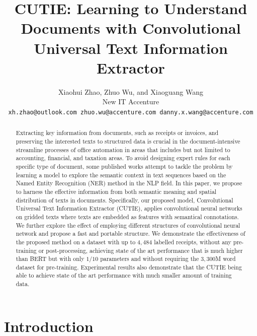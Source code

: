 \documentclass[10pt,twocolumn,letterpaper]{article}
\begin{document}
\title{CUTIE: Learning to Understand Documents with Convolutional Universal Text Information Extractor}

\author{
  Xiaohui Zhao, Zhuo Wu, and Xiaoguang Wang \\
  New IT Accenture \\
{\tt\small xh.zhao@outlook.com zhuo.wu@accenture.com danny.x.wang@accenture.com}
}

\maketitle

\begin{abstract}
   Extracting key information from documents, such as receipts or invoices, and preserving the interested texts to structured data is crucial in the document-intensive streamline processes of office automation in areas that includes but not limited to accounting, financial, and taxation areas. To avoid designing expert rules for each specific type of document, some published works attempt to tackle the problem by learning a model to explore the semantic context in text sequences based on the Named Entity Recognition (NER) method in the NLP field. In this paper, we propose to harness the effective information from both semantic meaning and spatial distribution of texts in documents. Specifically, our proposed model, Convolutional Universal Text Information Extractor (CUTIE), applies convolutional neural networks on gridded texts where texts are embedded as features with semantical connotations. We further explore the effect of employing different structures of convolutional neural network and propose a fast and portable structure. We demonstrate the effectiveness of the proposed method on a dataset with up to $4,484$ labelled receipts, without any pre-training or post-processing, achieving state of the art performance that is much higher than BERT but with only $1/10$ parameters and without requiring the $3,300$M word dataset for pre-training. Experimental results also demonstrate that the CUTIE being able to achieve state of the art performance with much smaller amount of training data.
\end{abstract}

\section{Introduction}
\end{document}
